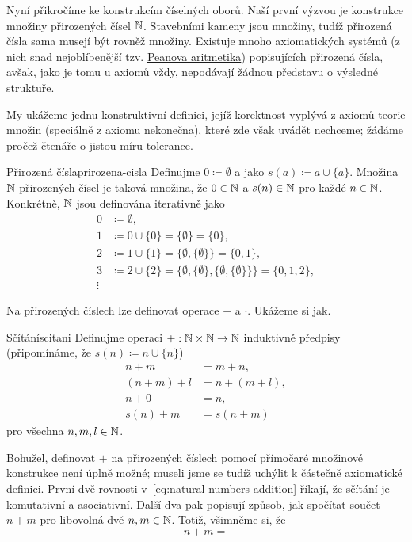 Nyní přikročíme ke konstrukcím číselných oborů. Naší první výzvou je konstrukce
množiny přirozených čísel $\mathbb{N}$. Stavebními kameny jsou množiny, tudíž přirozená
čísla sama musejí být rovněž množiny. Existuje mnoho axiomatických systémů (z
nich snad nejoblíbenější tzv.
\href{https://cs.wikipedia.org/wiki/Peanova_aritmetika}{Peanova aritmetika})
popisujících přirozená čísla, avšak, jako je tomu u axiomů vždy, nepodávají
žádnou představu o výsledné struktuře.

My ukážeme jednu konstruktivní definici, jejíž korektnost vyplývá z axiomů
teorie množin (speciálně z axiomu nekonečna), které zde však uvádět nechceme;
žádáme pročež čtenáře o jistou míru tolerance.

\begin{definition}{Přirozená čísla}{prirozena-cisla}
 Definujme $0 \coloneqq \emptyset$ a  jako $s(a) \coloneqq
 a \cup \{a\}$. Množina $\mathbb{N}$ přirozených čísel je taková množina, že $0 \in \mathbb{N}$
 a $s(n) \in \mathbb{N}$ pro každé $n \in \mathbb{N}$. Konkrétně, $\mathbb{N}$ jsou definována
 iterativně jako
 \begin{align*}
  0 &\coloneqq \emptyset,\\
  1 & \coloneqq 0 \cup \{0\} = \{\emptyset\} = \{0\},\\
  2 & \coloneqq 1 \cup \{1\} = \{\emptyset,\{\emptyset\}\} = \{0,1\},\\
  3 & \coloneqq 2 \cup \{2\} =
  \{\emptyset,\{\emptyset\},\{\emptyset,\{\emptyset\}\}\} = \{0,1,2\},\\
  \vdots
 \end{align*}
\end{definition}

Na přirozených číslech lze definovat operace $+$ a $ \cdot $. Ukážeme si jak.

\begin{definition}{Sčítání}{scitani}
Definujme operaci $+:\mathbb{N} \times \mathbb{N} \to \mathbb{N}$ induktivně předpisy (připomínáme, že
$s(n) \coloneqq n \cup \{n\}$)
 \begin{equation}
  \label{eq:natural-numbers-addition}
  \begin{split}
   n + m &= m + n,\\
   (n + m) + l &= n + (m + l),\\
   n + 0 &= n,\\
   s(n) + m &= s(n + m)
  \end{split}
 \end{equation}
 pro všechna $n,m,l \in \mathbb{N}$.
\end{definition}

Bohužel, definovat $+$ na přirozených číslech pomocí přímočaré množinové
konstrukce není úplně možné; museli jsme se tudíž uchýlit k částečně axiomatické
definici. První dvě rovnosti v~\eqref{eq:natural-numbers-addition} říkají, že
sčítání je komutativní a asociativní. Další dva pak popisují způsob, jak
spočítat součet $n + m$ pro libovolná dvě $n,m \in \mathbb{N}$. Totiž, všimněme si, že
\[
 n + m = 
\]

